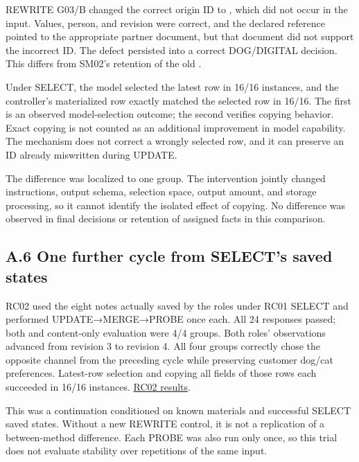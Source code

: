 \documentclass[10pt,a4paper]{article}
\begin{document}
REWRITE G03/B changed the correct origin ID \texttt{} to \texttt{}, which did not occur in the input. Values, person, and revision were correct, and the declared reference pointed to the appropriate partner document, but that document did not support the incorrect ID. The defect persisted into a correct DOG/DIGITAL decision. This differs from SM02's retention of the old \texttt{}.

Under SELECT, the model selected the latest row in 16/16 instances, and the controller's materialized row exactly matched the selected row in 16/16. The first is an observed model-selection outcome; the second verifies copying behavior. Exact copying is not counted as an additional improvement in model capability. The mechanism does not correct a wrongly selected row, and it can preserve an ID already miswritten during UPDATE.

The difference was localized to one group. The intervention jointly changed instructions, output schema, selection space, output amount, and storage processing, so it cannot identify the isolated effect of copying. No difference was observed in final decisions or retention of assigned facts in this comparison.

\subsection{A.6 One further cycle from SELECT's saved states}\label{paper-01-a.6-one-further-cycle-from-selects-saved-states}

RC02 used the eight notes actually saved by the roles under RC01 SELECT and performed UPDATE→\allowbreak{}MERGE→\allowbreak{}PROBE once each. All 24 responses passed; both \texttt{} and content-only evaluation were 4/4 groups. Both roles' observations advanced from revision 3 to revision 4. All four groups correctly chose the opposite channel from the preceding cycle while preserving customer dog/cat preferences. Latest-row selection and copying all fields of those rows each succeeded in 16/16 instances. \href{https://github.com/metaSATOKEN/MRSI/blob/9443de315d283874df0c27e0e99b8c04f400709d/docs/study2/row-carry-02-results-v0.1-2026-09-20.md}{RC02 results}.

This was a continuation conditioned on known materials and successful SELECT saved states. Without a new REWRITE control, it is not a replication of a between-method difference. Each PROBE was also run only once, so this trial does not evaluate stability over repetitions of the same input.
\end{document}
